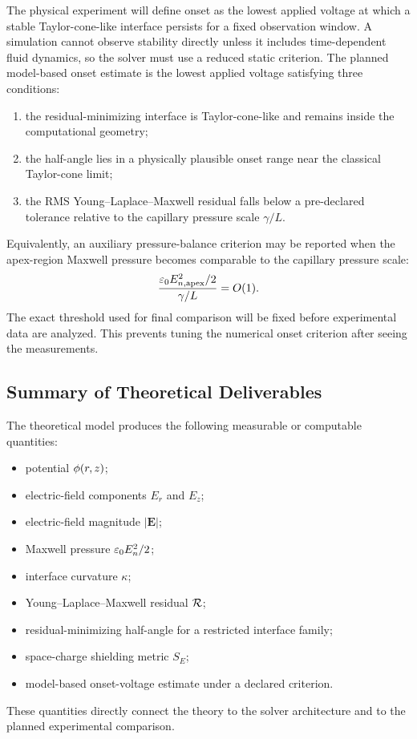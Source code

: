 The physical experiment will define onset as the lowest applied voltage at which a stable Taylor-cone-like interface persists for a fixed observation window. A simulation cannot observe stability directly unless it includes time-dependent fluid dynamics, so the solver must use a reduced static criterion. The planned model-based onset estimate is the lowest applied voltage satisfying three conditions:
\begin{enumerate}
    \item the residual-minimizing interface is Taylor-cone-like and remains inside the computational geometry;
    \item the half-angle lies in a physically plausible onset range near the classical Taylor-cone limit;
    \item the RMS Young--Laplace--Maxwell residual falls below a pre-declared tolerance relative to the capillary pressure scale $\gamma/L$.
\end{enumerate}
Equivalently, an auxiliary pressure-balance criterion may be reported when the apex-region Maxwell pressure becomes comparable to the capillary pressure scale:
\begin{equation}
    \frac{\varepsilon_0 E_{n,\mathrm{apex}}^2/2}{\gamma/L}=O(1).
\end{equation}
The exact threshold used for final comparison will be fixed before experimental data are analyzed. This prevents tuning the numerical onset criterion after seeing the measurements.

\subsection{Summary of Theoretical Deliverables}

The theoretical model produces the following measurable or computable quantities:
\begin{itemize}
    \item potential $\phi(r,z)$;
    \item electric-field components $E_r$ and $E_z$;
    \item electric-field magnitude $|\mathbf{E}|$;
    \item Maxwell pressure $\varepsilon_0 E_n^2/2$;
    \item interface curvature $\kappa$;
    \item Young--Laplace--Maxwell residual $\mathcal{R}$;
    \item residual-minimizing half-angle for a restricted interface family;
    \item space-charge shielding metric $S_E$;
    \item model-based onset-voltage estimate under a declared criterion.
\end{itemize}
These quantities directly connect the theory to the solver architecture and to the planned experimental comparison.
